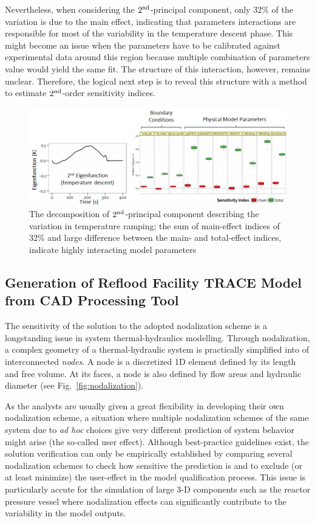 \documentclass[11pt,titlepage]{article}
\begin{document}
Nevertheless, when considering the $2^\textnormal{nd}$-principal component, only $32\%$ of the variation is due to the main effect, indicating that parameters interactions are responsible for most of the 
variability in the temperature descent phase.
This might become an issue when the parameters have to be calibrated against experimental data around this region because multiple combination of parameters value would yield the same fit.
The structure of this interaction, however, remains unclear.
Therefore, the logical next step is to reveal this structure with a method to estimate $2^\textnormal{nd}$-order sensitivity indices.

\begin{figure}[h!]
	\centering
	\includegraphics[scale=0.65]{figures/2ndPrincipalComponent.png}
	\caption{The decomposition of $2^\textnormal{nd}$-principal component describing the variation in temperature ramping; the sum of main-effect indices of $32\%$ and large difference between the main- and total-effect indices, indicate highly interacting model parameters}
	\label{fig:2ndpc}
\end{figure}

\subsection{Generation of Reflood Facility TRACE Model from CAD Processing Tool} 

The sensitivity of the solution to the adopted nodalization scheme is a longstanding issue in system thermal-hydraulics modelling.
Through nodalization, a complex geometry of a thermal-hydraulic system is practically simplified into  of interconnected \emph{nodes}. 
A node is a discretized 1D element defined by its length and free volume. 
At its faces, a node is also defined by flow areas and hydraulic diameter (see Fig.~\ref{fig:nodalization}).

As the analysts are usually given a great flexibility in developing their own nodalization scheme, a situation where multiple nodalization schemes of the same system due to \textit{ad hoc} choices give very different prediction of system behavior might arise (the so-called user effect).
Although best-practice guidelines exist, the solution verification can only be empirically established by comparing several nodalization schemes to check how sensitive the prediction is and to exclude (or at least minimize) the user-effect in the model qualification process.
This issue is particularly accute for the simulation of large 3-D components such as the reactor pressure vessel where nodalization effects can significantly contribute to the variability in the model outputs.
\end{document}
